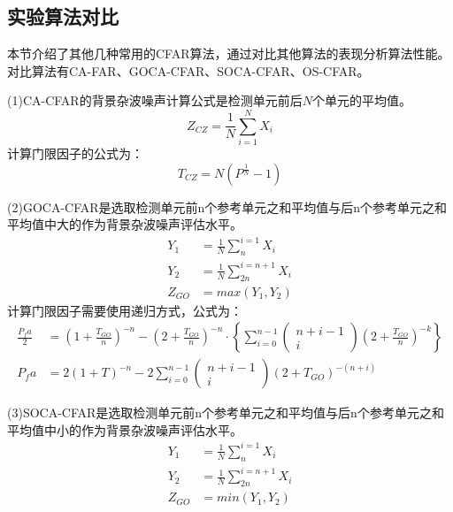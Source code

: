 \subsection{实验算法对比}
本节介绍了其他几种常用的CFAR算法，通过对比其他算法的表现分析算法性能。对比算法有CA-FAR、GOCA-CFAR、SOCA-CFAR、OS-CFAR。
\par
(1)CA-CFAR的背景杂波噪声计算公式是检测单元前后$N$个单元的平均值。
\begin{equation}
	Z_{CZ} = \frac{1}{N}\sum_{i=1}^{N}X_i
\end{equation}
计算门限因子的公式为：
\begin{equation}
	T_{CZ} = N(P^{\frac{1}{N}} - 1)
\end{equation}
\par
(2)GOCA-CFAR是选取检测单元前n个参考单元之和平均值与后n个参考单元之和平均值中大的作为背景杂波噪声评估水平。
\begin{equation}
	\begin{split}
		Y_1 &= \frac{1}{N} \sum_{n}^{i=1}X_i \\
		Y_2 &= \frac{1}{N} \sum_{2n}^{i=n+1}X_i\\
		Z_{GO} &= max\left(Y_1, Y_2\right)
	\end{split}
\end{equation}
计算门限因子需要使用递归方式，公式为：
\begin{equation}
	\begin{split}
	\frac{P_fa}{2} &= \left(1+\frac{T_{GO}}{n} \right)^{-n} -   \left(2+\frac{T_{GO}}{n} \right)^{-n} 
	\cdot  \left\{ \sum_{i=0}^{n-1}\begin{pmatrix}  n+i-1\\i \end{pmatrix} \left(2+ \frac{T_{GO}}{n} \right)^{-k} \right\} \\
	P_fa &= 2\left( 1+T \right)^{-n} -  2\sum_{i=0}^{n-1}\begin{pmatrix}  n+i-1\\i \end{pmatrix}  \left(2+T_{GO} \right)^{-(n+i)}
	\end{split}
\end{equation}
\par
(3)SOCA-CFAR是选取检测单元前n个参考单元之和平均值与后n个参考单元之和平均值中小的作为背景杂波噪声评估水平。
\begin{equation}
	\begin{split}
		Y_1 &= \frac{1}{N} \sum_{n}^{i=1}X_i \\
		Y_2 &= \frac{1}{N} \sum_{2n}^{i=n+1}X_i\\
		Z_{GO} &= min\left(Y_1, Y_2\right)
	\end{split}
\end{equation}
